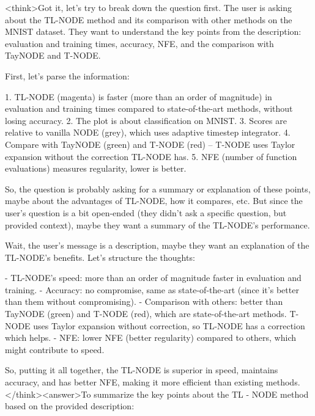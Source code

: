 <think>Got it, let's try to break down the question first. The user is asking about the TL-NODE method and its comparison with other methods on the MNIST dataset. They want to understand the key points from the description: evaluation and training times, accuracy, NFE, and the comparison with TayNODE and T-NODE.

First, let's parse the information:

1. TL-NODE (magenta) is faster (more than an order of magnitude) in evaluation and training times compared to state-of-the-art methods, without losing accuracy.
2. The plot is about classification on MNIST.
3. Scores are relative to vanilla NODE (grey), which uses adaptive timestep integrator.
4. Compare with TayNODE (green) and T-NODE (red) – T-NODE uses Taylor expansion without the correction TL-NODE has.
5. NFE (number of function evaluations) measures regularity, lower is better.

So, the question is probably asking for a summary or explanation of these points, maybe about the advantages of TL-NODE, how it compares, etc. But since the user's question is a bit open-ended (they didn't ask a specific question, but provided context), maybe they want a summary of the TL-NODE's performance.

Wait, the user's message is a description, maybe they want an explanation of the TL-NODE's benefits. Let's structure the thoughts:

- TL-NODE's speed: more than an order of magnitude faster in evaluation and training.
- Accuracy: no compromise, same as state-of-the-art (since it's better than them without compromising).
- Comparison with others: better than TayNODE (green) and T-NODE (red), which are state-of-the-art methods. T-NODE uses Taylor expansion without correction, so TL-NODE has a correction which helps.
- NFE: lower NFE (better regularity) compared to others, which might contribute to speed.

So, putting it all together, the TL-NODE is superior in speed, maintains accuracy, and has better NFE, making it more efficient than existing methods.</think><answer>To summarize the key points about the TL - NODE method based on the provided description:  

